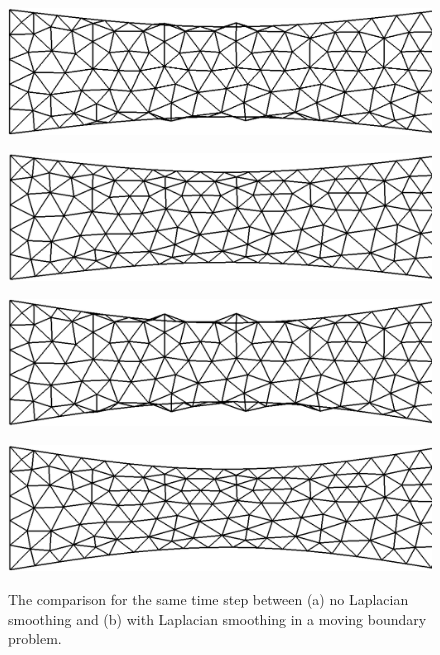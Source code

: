 \begin{figure}[H]
\begin{minipage}{.50\linewidth}
     \end{minipage}\\[7pt]
     \begin{minipage}{.50\linewidth}
      \centering
      \includegraphics[scale=0.19]{./02_chaps/cap_numerico/figure/no3.png}\\
     \end{minipage}%
     \begin{minipage}{.50\linewidth}
      \centering
      \includegraphics[scale=0.19]{./02_chaps/cap_numerico/figure/with3.png}\\
     \end{minipage}
     \begin{minipage}{.50\linewidth}
     \medskip
      \centering
      \includegraphics[scale=0.19]{./02_chaps/cap_numerico/figure/no4.png}\\
     \end{minipage}%
     \begin{minipage}{.50\linewidth}
     \medskip
      \centering
      \includegraphics[scale=0.19]{./02_chaps/cap_numerico/figure/with4.png}\\
     \end{minipage}
     \medskip
     \caption{
The comparison for the same time step between 
     (a) no Laplacian smoothing and
     (b) with Laplacian smoothing
in a moving boundary problem.
}
     \label{laplacian smoothing fig}
\end{figure}



